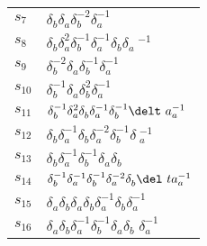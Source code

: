 \documentclass{article}
\begin{document}
\begin{center}
\begin{tabular}{ll}
$s_{7}$ & $\delta_b^{}\delta_a^{}\delta_b^{-2}\delta_a^{-1}$ \\
$s_{8}$ & $\delta_b^{}\delta_a^{2}\delta_b^{-1}\delta_a^{-1}\delta_b^{}\delta_a\
^{-1}$ \\
$s_{9}$ & $\delta_b^{-2}\delta_a^{}\delta_b^{-1}\delta_a^{-1}$ \\
$s_{10}$ & $\delta_b^{-1}\delta_a^{}\delta_b^{2}\delta_a^{-1}$ \\
$s_{11}$ & $\delta_b^{-1}\delta_a^{2}\delta_b^{}\delta_a^{-1}\delta_b^{-1}\delt\
a_a^{-1}$ \\
$s_{12}$ & $\delta_b^{}\delta_a^{-1}\delta_b^{}\delta_a^{-2}\delta_b^{-1}\delta\
_a^{-1}$ \\
$s_{13}$ & $\delta_b^{}\delta_a^{-1}\delta_b^{-1}\delta_a^{}\delta_b^{}$ \\
$s_{14}$ & $\delta_b^{-1}\delta_a^{-1}\delta_b^{-1}\delta_a^{-2}\delta_b^{}\del\
ta_a^{-1}$ \\
$s_{15}$ & $\delta_a^{}\delta_b^{}\delta_a^{}\delta_b^{}\delta_a^{-1}\delta_b^{\
}\delta_a^{-1}$ \\
$s_{16}$ & $\delta_a^{}\delta_b^{}\delta_a^{-1}\delta_b^{-1}\delta_a^{}\delta_b\
^{}\delta_a^{-1}$ \\
\bottomrule
\end{tabular}
\end{center}

\thispagestyle{empty}
\end{document}
